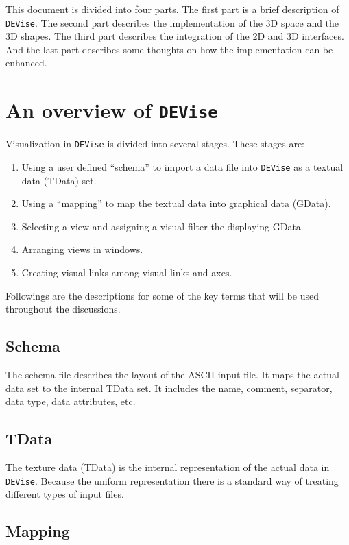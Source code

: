 This document is divided into four parts. The first part 
is a brief description of {\tt DEVise}.  The second part describes the
implementation of the 3D space and the 3D shapes.  The third part
describes the integration of the 2D and 3D interfaces.  And the 
last part describes some thoughts on how the implementation can 
be enhanced.

\section{An overview of {\tt DEVise}}

Visualization in {\tt DEVise} is divided into several stages.  
These stages are:

\begin{enumerate}
	\item Using a user defined ``schema'' to import a data file 
		into {\tt DEVise} as a textual data (TData) set.
	\item Using a ``mapping'' to map the textual data into graphical
		data (GData).
	\item Selecting a view and assigning a visual filter the 
		displaying GData.
	\item Arranging views in windows.
	\item Creating visual links among visual links and axes.
\end{enumerate}

Followings are the descriptions for some of the key terms that
will be used throughout the discussions.

\subsection{Schema}

The schema file describes the layout of the ASCII input file.  It
maps the actual data set to the internal TData set.  It includes the
name, comment, separator, data type, data attributes, etc.

\subsection{TData}

The texture data (TData) is the internal representation of the 
actual data in {\tt DEVise}.  Because the uniform representation
there is a standard way of treating different types of input files.

\subsection{Mapping}


